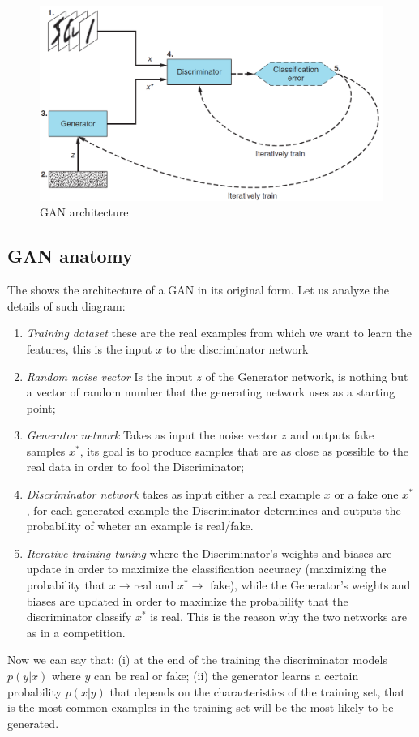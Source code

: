 \begin{figure} 
    \centering
    \includegraphics[scale=0.6]{img/GAN_1.png}
    \caption{GAN architecture}
    \label{fig:GAN_arch}
\end{figure}

\subsection{GAN anatomy}
The  shows the architecture of a GAN in its original form. Let us analyze the details of such diagram: 
\begin{enumerate}
    \itemsep-0.2em
    \item \textit{Training dataset} these are the real examples from which we want to learn the features, this is the input $x$ to the discriminator network
    \item \textit{Random noise vector} Is the input $z$ of the Generator network, is nothing but a vector of random number that the generating network uses as a starting point;
    \item \textit{Generator network} Takes as input the noise vector $z$ and outputs fake samples $x^*$, its goal is to produce samples that are as close as possible to the real data in order to fool  the Discriminator; 
    \item \textit{Discriminator network}  takes as input either a real example $x$ or a fake one $x^*$, for each generated example the Discriminator determines and outputs the probability of wheter an example is real/fake.
    \item \textit{Iterative training tuning} where the Discriminator's weights and biases are update in order to maximize the classification accuracy (maximizing the probability that $x \to${real} and $x^* \to$ fake), while the Generator's weights and biases are updated in order to maximize the probability that the discriminator classify $x^*$ is real. This is the reason why the two networks are as in a competition.
\end{enumerate}
Now we can say that: (i) at the end of the training the discriminator models $p(y|x)$ where $y$ can be real or fake; (ii) the generator learns a certain probability $p(x|y)$ that depends on the characteristics of the training set, that is the most common examples in the training set will be the most likely to be generated.\\

